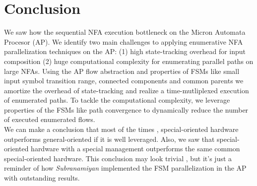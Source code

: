 \section{Conclusion}
We saw how the sequential NFA execution bottleneck on the Micron Automata Procesor (AP). We identify two main
challenges to applying enumerative NFA parallelization techniques
on the AP: (1) high state-tracking overhead for input composition (2)
huge computational complexity for enumerating parallel paths on
large NFAs. Using the AP flow abstraction and properties of FSMs
like small input symbol transition range, connected components and
common parents we amortize the overhead of state-tracking and
realize a time-mutliplexed execution of enumerated paths. To tackle
the computational complexity, we leverage properties of the FSMs
like path convergence to dynamically reduce the number of executed
enumerated flows.\\
We can make a conclusion that most of the times , special-oriented hardware outperforms general-oriented if it is well leveraged. Also, we saw that special-oriented hardware with a special management outperforms the same common special-oriented hardware.
This conclusion may look trivial , but it's just a reminder of how \textit{Subranamiyan} \cite{1} implemented the FSM parallelization in the AP with outstanding results.